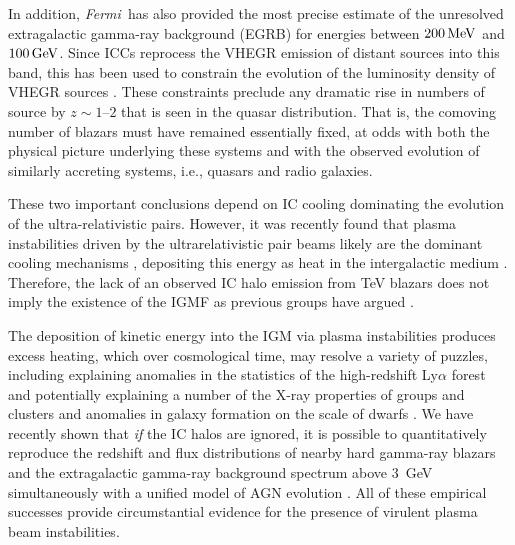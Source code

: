 \documentclass[usenatbib,iop,apj,numberedappendix]{aeb_emulateapj_2015}
\newcommand\qc[1]{{\color{red} \bf #1}}
\def\eV{{\rm eV}} %
\def\MeV{{\rm M}\eV} %
\def\GeV{{\rm G}\eV} %
\def\Fermi{{\em Fermi\ }}
\begin{document}
In addition, \Fermi has also provided the most precise estimate of the unresolved
extragalactic gamma-ray background (EGRB) for energies between
$200\,\MeV$ and $100\,\GeV$.  Since ICCs reprocess the VHEGR emission of
distant sources into this band, this has been used to constrain the
evolution of the luminosity density of VHEGR sources
\citep[see, e.g., ][]{Naru-Tota:06,Knei-Mann:08,Inou-Tota:09,Vent:10}.
These constraints preclude any dramatic rise in numbers of source by $z\sim1$--$2$ that is seen in the quasar
distribution.  That is, the comoving number of blazars must have
remained essentially fixed, at odds with both the physical picture
underlying these systems and with the observed evolution of similarly
accreting systems, i.e., quasars and radio galaxies.

These two important conclusions depend on IC cooling dominating the evolution of the ultra-relativistic pairs.  However, it was recently found that plasma instabilities driven by the
ultrarelativistic pair beams  likely are the dominant cooling mechanisms
\citep{paperI,Schlickeiser+12,Schlickeiser+13}, depositing this energy
as heat in the intergalactic medium \citep{paperII,paperIII}.  Therefore, the lack of an observed
 IC halo emission from TeV blazars does not imply the existence of the IGMF as previous groups have argued
\citep{paperI,Schlickeiser+12,Schlickeiser+13}.


The deposition of kinetic energy into the IGM via plasma instabilities produces excess heating, which over cosmological time, may resolve a variety
of puzzles, including explaining
anomalies in the statistics of the high-redshift Ly$\alpha$ forest
\citep{paperIV} and potentially explaining a number of the X-ray
properties of groups and clusters and anomalies in galaxy formation on
the scale of dwarfs \citep{paperIII,Lu+2013}.  We
have recently shown that \textit{if} the IC halos are ignored, it is possible
to quantitatively reproduce the redshift and flux distributions
of nearby hard gamma-ray blazars and the extragalactic gamma-ray background
spectrum above 3~GeV simultaneously with a unified model of AGN evolution
\citep{Broderick+2013,Broderick+2013b}.  All of these empirical successes provide
circumstantial evidence for the presence of virulent plasma beam
instabilities. 
\end{document}
